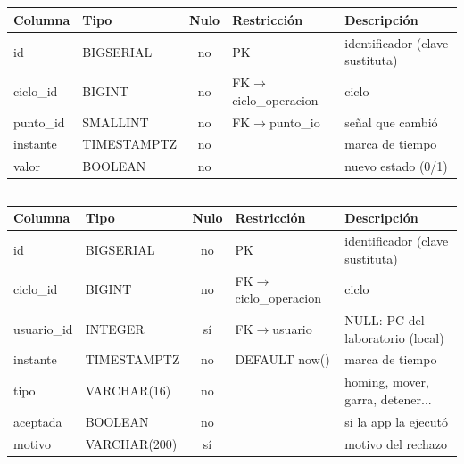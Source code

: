 \subsection*{}
\begin{longtable}{>{\ttfamily\raggedright}p{2.6cm} >{\ttfamily\raggedright}p{2.5cm} c >{\raggedright\footnotesize}p{3.6cm} >{\raggedright\arraybackslash}p{4.5cm}}
\toprule \textrm{\textbf{Columna}} & \textrm{\textbf{Tipo}} & \textbf{Nulo} & \textbf{Restricción} & \textbf{Descripción}\\ \midrule
id & BIGSERIAL & no & PK & identificador (clave sustituta)\\
ciclo\_id & BIGINT & no & FK$\to$ciclo\_operacion & ciclo\\
punto\_id & SMALLINT & no & FK$\to$punto\_io & señal que cambió\\
instante & TIMESTAMPTZ & no &  & marca de tiempo\\
valor & BOOLEAN & no &  & nuevo estado (0/1)\\
\bottomrule \end{longtable}
\subsection*{}
\begin{longtable}{>{\ttfamily\raggedright}p{2.6cm} >{\ttfamily\raggedright}p{2.5cm} c >{\raggedright\footnotesize}p{3.6cm} >{\raggedright\arraybackslash}p{4.5cm}}
\toprule \textrm{\textbf{Columna}} & \textrm{\textbf{Tipo}} & \textbf{Nulo} & \textbf{Restricción} & \textbf{Descripción}\\ \midrule
id & BIGSERIAL & no & PK & identificador (clave sustituta)\\
ciclo\_id & BIGINT & no & FK$\to$ciclo\_operacion & ciclo\\
usuario\_id & INTEGER & sí & FK$\to$usuario & NULL: PC del laboratorio (local)\\
instante & TIMESTAMPTZ & no & DEFAULT now() & marca de tiempo\\
tipo & VARCHAR(16) & no &  & homing, mover, garra, detener...\\
aceptada & BOOLEAN & no &  & si la app la ejecutó\\
motivo & VARCHAR(200) & sí &  & motivo del rechazo\\
\bottomrule \end{longtable}
